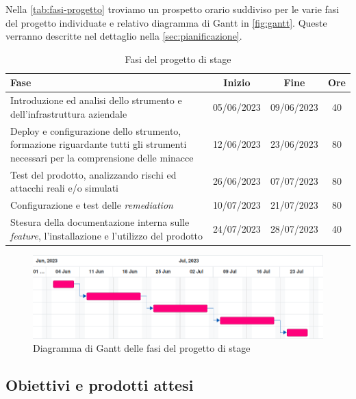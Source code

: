 Nella \autoref{tab:fasi-progetto} troviamo un prospetto orario suddiviso per le varie fasi del progetto individuate e relativo diagramma di Gantt in \autoref{fig:gantt}. Queste verranno descritte nel dettaglio nella \autoref{sec:pianificazione}.

\begin{table}[!htbp]
    \centering
    \begin{tabularx}{\linewidth}{Xccc}
        \toprule
        {\textbf{Fase}} & \textbf{Inizio} & \textbf{Fine} & \textbf{Ore} \\
        \midrule
        Introduzione ed analisi dello strumento e dell'infrastruttura aziendale & 05/06/2023 & 09/06/2023 & 40 \\
        Deploy e configurazione dello strumento, formazione riguardante tutti gli strumenti necessari per la comprensione delle minacce & 12/06/2023 & 23/06/2023 & 80 \\
        Test del prodotto, analizzando rischi ed attacchi reali e/o simulati & 26/06/2023 & 07/07/2023 & 80 \\
        Configurazione e test delle \emph{remediation} & 10/07/2023 & 21/07/2023 & 80 \\
        Stesura della documentazione interna sulle \emph{feature}, l'installazione e l'utilizzo del prodotto & 24/07/2023 & 28/07/2023 & 40 \\
        \bottomrule
    \end{tabularx}
    \caption{Fasi del progetto di stage}
    \label{tab:fasi-progetto}
\end{table}

\begin{figure}[!htbp]
    \centering
    \includegraphics[width=\textwidth]{../images/gantt.png}
    \caption{Diagramma di Gantt delle fasi del progetto di stage}
    \label{fig:gantt}
\end{figure}

\subsection{Obiettivi e prodotti attesi}
\label{sez:obiettivi}

